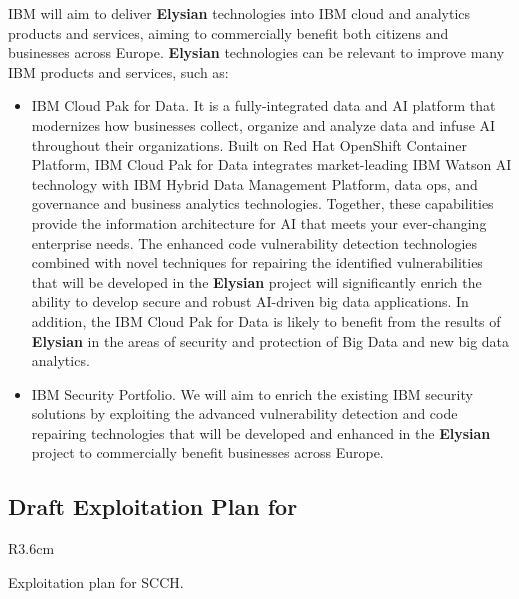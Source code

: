 \documentclass[a4paper,11pt]{article}
\newcommand{\project}[1]{\textbf{#1}\xspace}
\newcommand{\SECURITY}{\project{Elysian}}
\newcommand{\TheProject}{\SECURITY}
\begin{document}
IBM will aim to deliver \TheProject technologies into IBM cloud and analytics products and services, aiming to commercially benefit both citizens and businesses across Europe. \TheProject technologies can be relevant to improve many IBM products and services, such as:
\begin{itemize}
    \item IBM Cloud Pak for Data. It is a fully-integrated data and AI platform that modernizes how businesses collect, organize and analyze data and infuse AI throughout their organizations. Built on Red Hat OpenShift Container Platform, IBM Cloud Pak for Data integrates market-leading IBM Watson AI technology with IBM Hybrid Data Management Platform, data ops, and governance and business analytics technologies. Together, these capabilities provide the information architecture for AI that meets your ever-changing enterprise needs. The enhanced code vulnerability detection technologies combined with novel techniques for repairing the identified vulnerabilities that will be developed in the \TheProject project will significantly enrich the ability to develop secure and robust AI-driven big data applications. In addition, the IBM Cloud Pak for Data is likely to benefit from the results of \TheProject in the areas of security and protection of Big Data and new big data analytics.
    \item IBM Security Portfolio. We will aim to enrich the existing IBM security solutions by exploiting the advanced vulnerability detection and code repairing technologies that will be developed and enhanced in the \TheProject project to commercially benefit businesses across Europe.
\end{itemize}

\horizontalline

\subsection*{Draft Exploitation Plan for \SCCHshort{}}
\vspace{-6pt}

\begin{wrapfigure}{R}{3.6cm}
\vspace{-1.3cm}
\hfill {}
\vspace{-0.8cm}
\end{wrapfigure}

Exploitation plan for SCCH.

\horizontalline
\end{document}
